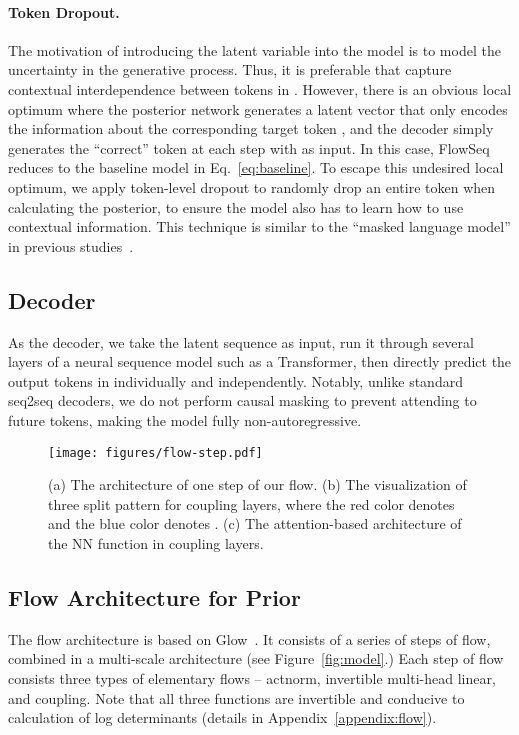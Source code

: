 \documentclass[11pt,a4paper]{article}
\begin{document}
\paragraph{Token Dropout.} 
The motivation of introducing the latent variable  into the model is to model the uncertainty in the generative process.
Thus, it is preferable that  capture contextual interdependence between tokens in .
However, there is an obvious local optimum where the posterior network generates a latent vector  that only encodes the information about the corresponding target token , and the decoder simply generates the ``correct'' token at each step  with  as input.
In this case, FlowSeq reduces to the baseline model in Eq.~\eqref{eq:baseline}.
To escape this undesired local optimum, we apply token-level dropout to randomly drop an entire token when calculating the posterior, to ensure the model also has to learn how to use contextual information.
This technique is similar to the ``masked language model'' in previous studies~\citep{melamud-etal-2016-context2vec,devlin2018bert,P18-1130}.

\vspace{-2mm}
\subsection{Decoder}
As the decoder, we take the latent sequence  as input, run it through several layers of a neural sequence model such as a Transformer, then directly predict the output tokens in  individually and independently.
Notably, unlike standard seq2seq decoders,
we do not perform causal masking to prevent attending to future tokens,
making the model fully non-autoregressive.



\begin{figure*}[tb]
  \centering
  \texttt{[image: figures/flow-step.pdf]}
  \vspace{-2mm}
  \caption{(a) The architecture of one step of our flow.
  (b) The visualization of three split pattern for coupling layers, where the red color denotes  and the blue color denotes .
  (c) The attention-based architecture of the NN function in coupling layers.} 
  \label{fig:flowstep}
  \vspace{-5mm}
\end{figure*}

\subsection{Flow Architecture for Prior}
The flow architecture is based on Glow~\citep{kingma2018glow}.
It consists of a series of steps of flow, combined in a multi-scale architecture (see Figure~\ref{fig:model}.)
Each step of flow consists three types of elementary flows -- actnorm, invertible multi-head linear, and coupling.
Note that all three functions are invertible and conducive to calculation of log determinants (details in Appendix~\ref{appendix:flow}).
\end{document}
